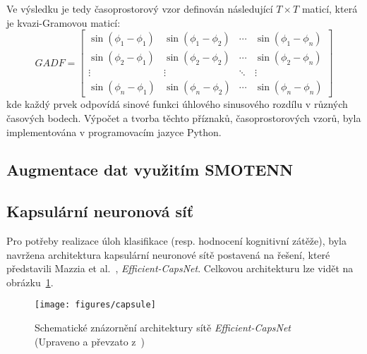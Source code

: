 Ve výsledku je tedy časoprostorový vzor definován následující $T \times T$
maticí, která je kvazi-Gramovou maticí:
\begin{equation}
    GADF = \left[\begin{array}{cccc}
            \sin \left(\phi_1-\phi_1\right) & \sin \left(\phi_1-\phi_2\right) & \cdots & \sin \left(\phi_1-\phi_n\right) \\
            \sin \left(\phi_2-\phi_1\right) & \sin \left(\phi_2-\phi_2\right) & \cdots & \sin \left(\phi_2-\phi_n\right) \\
            \vdots                          & \vdots                          & \ddots & \vdots                          \\
            \sin \left(\phi_n-\phi_1\right) & \sin \left(\phi_n-\phi_2\right) & \cdots & \sin \left(\phi_n-\phi_n\right)
        \end{array}\right]
\end{equation}
kde každý prvek odpovídá sinové funkci úhlového sinusového rozdílu v různých
časových bodech. Výpočet a tvorba těchto příznaků, časoprostorových vzorů, byla
implementována v programovacím jazyce Python.

\subsection{Augmentace dat využitím SMOTENN}
\label{subsec:augmentace_dat}

\subsection{Kapsulární neuronová síť}
\label{subsec:kapsularni_sit}
Pro potřeby realizace úloh klasifikace (resp. hodnocení kognitivní zátěže), byla
navržena architektura kapsulární neuronové sítě postavená na řešení, které
představili Mazzia et al.~\cite{Mazzia2021}, \textit{Efficient-CapsNet}.
Celkovou architekturu lze vidět na obrázku~\ref{fig:architektura}.

\begin{figure}[h]
    \begin{center}
        \texttt{[image: figures/capsule]}
        \caption{Schematické znázornění architektury sítě
            \textit{Efficient-CapsNet} (Upraveno a převzato z~\cite{Zhou2021})}
        \label{fig:architektura}
    \end{center}
\end{figure}


